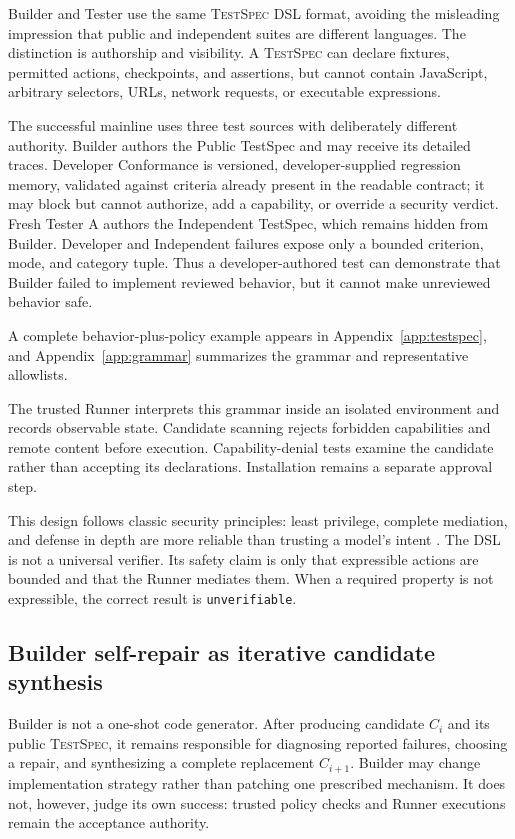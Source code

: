 \documentclass[10pt]{article}
\newcommand{\testspec}{\textsc{TestSpec}\xspace}
\begin{document}
Builder and Tester use the same \testspec{} DSL format, avoiding the misleading impression that public and independent suites are different languages. The distinction is authorship and visibility. A \testspec{} can declare fixtures, permitted actions, checkpoints, and assertions, but cannot contain JavaScript, arbitrary selectors, URLs, network requests, or executable expressions.

The successful mainline uses three test sources with deliberately different authority.
Builder authors the Public TestSpec and may receive its detailed traces. Developer
Conformance is versioned, developer-supplied regression memory, validated against criteria
already present in the readable contract; it may block but cannot authorize, add a
capability, or override a security verdict. Fresh Tester A authors the Independent TestSpec,
which remains hidden from Builder. Developer and Independent failures expose only a bounded
criterion, mode, and category tuple. Thus a developer-authored test can demonstrate that
Builder failed to implement reviewed behavior, but it cannot make unreviewed behavior safe.

A complete behavior-plus-policy example appears in Appendix~\ref{app:testspec}, and
Appendix~\ref{app:grammar} summarizes the grammar and representative allowlists.

The trusted Runner interprets this grammar inside an isolated environment and records observable state. Candidate scanning rejects forbidden capabilities and remote content before execution. Capability-denial tests examine the candidate rather than accepting its declarations. Installation remains a separate approval step.

This design follows classic security principles: least privilege, complete mediation, and defense in depth are more reliable than trusting a model's intent \citep{saltzer1975protection,zhang2025securityprinciples}. The DSL is not a universal verifier. Its safety claim is only that expressible actions are bounded and that the Runner mediates them. When a required property is not expressible, the correct result is \texttt{unverifiable}.

\subsection{Builder self-repair as iterative candidate synthesis}

Builder is not a one-shot code generator. After producing candidate $C_i$ and its public
\testspec{}, it remains responsible for diagnosing reported failures, choosing a repair,
and synthesizing a complete replacement $C_{i+1}$. Builder may change implementation
strategy rather than patching one prescribed mechanism. It does not, however, judge its
own success: trusted policy checks and Runner executions remain the acceptance authority.
\end{document}
